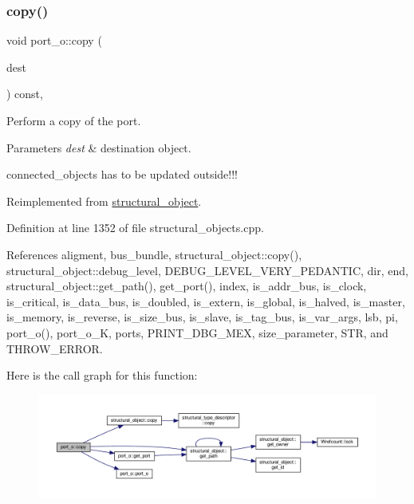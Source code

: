 \subsubsection{\texorpdfstring{copy()}{copy()}}
{\footnotesize\ttfamily void port\+\_\+o\+::copy (\begin{DoxyParamCaption}\item[{\hyperlink{structural__objects_8hpp_a8ea5f8cc50ab8f4c31e2751074ff60b2}{structural\+\_\+object\+Ref}}]{dest }\end{DoxyParamCaption}) const\hspace{0.3cm}{\ttfamily [override]}, {\ttfamily [virtual]}}



Perform a copy of the port. 


\begin{DoxyParams}{Parameters}
{\em dest} & destination object. \\
\hline
\end{DoxyParams}
connected\+\_\+objects has to be updated outside!!! 

Reimplemented from \hyperlink{classstructural__object_a6566435c67934f6b4ff1b319c0682b18}{structural\+\_\+object}.



Definition at line 1352 of file structural\+\_\+objects.\+cpp.



References aligment, bus\+\_\+bundle, structural\+\_\+object\+::copy(), structural\+\_\+object\+::debug\+\_\+level, D\+E\+B\+U\+G\+\_\+\+L\+E\+V\+E\+L\+\_\+\+V\+E\+R\+Y\+\_\+\+P\+E\+D\+A\+N\+T\+IC, dir, end, structural\+\_\+object\+::get\+\_\+path(), get\+\_\+port(), index, is\+\_\+addr\+\_\+bus, is\+\_\+clock, is\+\_\+critical, is\+\_\+data\+\_\+bus, is\+\_\+doubled, is\+\_\+extern, is\+\_\+global, is\+\_\+halved, is\+\_\+master, is\+\_\+memory, is\+\_\+reverse, is\+\_\+size\+\_\+bus, is\+\_\+slave, is\+\_\+tag\+\_\+bus, is\+\_\+var\+\_\+args, lsb, pi, port\+\_\+o(), port\+\_\+o\+\_\+K, ports, P\+R\+I\+N\+T\+\_\+\+D\+B\+G\+\_\+\+M\+EX, size\+\_\+parameter, S\+TR, and T\+H\+R\+O\+W\+\_\+\+E\+R\+R\+OR.

Here is the call graph for this function\+:
\nopagebreak
\begin{figure}[H]
\begin{center}
\leavevmode
\includegraphics[width=350pt]{df/d75/structport__o_a6450d734ab8d67ff5ab6305a09e95a7e_cgraph}
\end{center}
\end{figure}
\mbox{\label{structport__o_afdb4346833a3eac62db21966c7fc65c5}} 
